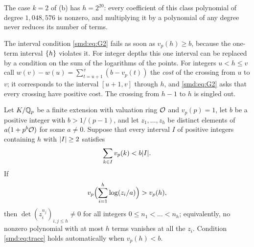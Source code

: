 The case $k=2$ of (b) has $h=2^{20}$: every coefficient of this class polynomial of degree
$1{,}048{,}576$ is nonzero, and multiplying it by a polynomial of any degree never reduces
its number of terms.

The interval condition \eqref{smd:eq:G2} fails as soon as $v_p(h)\ge b$, because the
one-term interval $\{h\}$ violates it. For integer depths this one interval can be
replaced by a condition on the sum of the logarithms of the points. For integers
$u<h\le v$ call $w(v)-w(u)=\sum_{t=u+1}^{v}(b-v_p(t))$ the \emph{cost} of the crossing
from $u$ to $v$; it corresponds to the interval $[u+1,v]$ through $h$, and
\eqref{smd:eq:G2} asks that every crossing have positive cost. The crossing from $h-1$ to
$h$ is singled out.

\begin{theorem}\label{smd:thm:trace}
Let $K/\mathbb{Q}_p$ be a finite extension with valuation ring $\mathcal{O}$ and $v_p(p)=1$, let $b$ be a
positive integer with $b>1/(p-1)$, and let $z_1,\dots,z_h$ be distinct elements of
$a(1+p^b\mathcal{O})$ for some $a\ne0$. Suppose that every interval $I$ of positive integers
containing $h$ with $\lvert I\rvert\ge2$ satisfies
\begin{equation}\label{smd:eq:window}
 \sum_{k\in I}v_p(k)<b\lvert I\rvert .
\end{equation}
If
\begin{equation}\label{smd:eq:trace}
 v_p\Bigl(\sum_{i=1}^{h}\log(z_i/a)\Bigr)>v_p(h),
\end{equation}
then $\det(z_i^{n_j})_{i,j\le h}\ne0$ for all integers $0\le n_1<\dots<n_h$; equivalently,
no nonzero polynomial with at most $h$ terms vanishes at all the $z_i$. Condition
\eqref{smd:eq:trace} holds automatically when $v_p(h)<b$.
\end{theorem}

